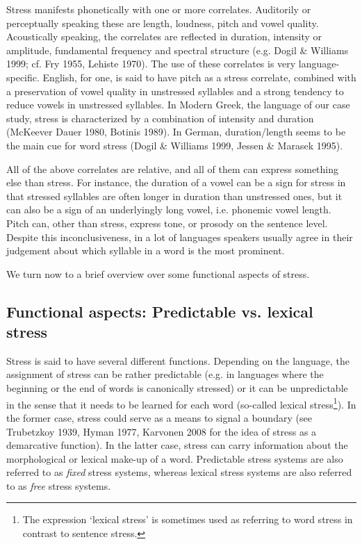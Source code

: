 \documentclass[a4paper]{article}
\begin{document}
Stress manifests phonetically with one or more correlates. Auditorily or perceptually speaking these are length, loudness, pitch and vowel quality. Acoustically speaking, the correlates are reflected in duration, intensity or amplitude, fundamental frequency and spectral structure (e.g. Dogil \& Williams 1999; cf. Fry 1955, Lehiste 1970). The use of these correlates is very language-specific. English, for one, is said to have pitch as a stress correlate, combined with a preservation of vowel quality in unstressed syllables and a strong tendency to reduce vowels in unstressed syllables. In Modern Greek, the language of our case study, stress is characterized by a combination of intensity and duration (McKeever Dauer 1980, Botinis 1989). In German, duration/length seems to be the main cue for word stress (Dogil \& Williams 1999, Jessen \& Marasek 1995).

All of the above correlates are relative, and all of them can express something else than stress. For instance, the duration of a vowel can be a sign for stress in that stressed syllables are often longer in duration than unstressed ones, but it can also be a sign of an underlyingly long vowel, i.e. phonemic vowel length. Pitch can, other than stress, express tone, or prosody on the sentence level. Despite this inconclusiveness, in a lot of languages speakers usually agree in their judgement about which syllable in a word is the most prominent.

We turn now to a brief overview over some functional aspects of stress.


\subsection{
Functional aspects: Predictable vs. lexical stress}


Stress is said to have several different functions. Depending on the language, the assignment of stress can be rather predictable (e.g. in languages where the beginning or the end of words is canonically stressed) or it can be unpredictable in the sense that it needs to be learned for each word (so-called lexical stress\footnote{ The expression ‘lexical stress’ is sometimes used as referring to word stress in contrast to sentence stress.}). In the former case, stress could serve as a means to signal a boundary (see Trubetzkoy 1939, Hyman 1977, Karvonen 2008 for the idea of stress as a demarcative function). In the latter case, stress can carry information about the morphological or lexical make-up of a word. Predictable stress systems are also referred to as \textit{fixed} stress systems, whereas lexical stress systems are also referred to as \textit{free} stress systems.
\end{document}
